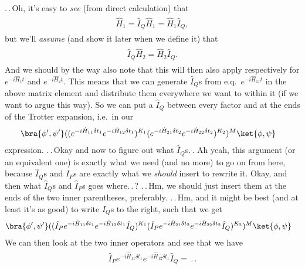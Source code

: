 \documentclass{report}
\begin{document}
.\,.\,Oh, it's easy to \emph{see} (from direct calculation) that 
\begin{align}
\begin{aligned}
	\hat H_1 = \hat I_Q \hat H_1 = \hat H_1 \hat I_Q,
\end{aligned}
\end{align}
but we'll \emph{assume} (and show it later when we define it) that
\begin{align}
\begin{aligned}
	\hat I_Q \hat H_2 = \hat H_2 \hat I_Q.
\end{aligned}
\end{align}
And we should by the way also note that this will then also apply respectively for $e^{-i  \hat H_1 t }$ and $e^{-i  \hat H_2 t }$. This means that we can generate $\hat I_Q$s from e.q.\ $e^{-i  \hat H_{11} t }$ in the above matrix element and distribute them everywhere we want to within it (if we want to argue this way). So we can put a $\hat I_Q$ between every factor and at the ends of the Trotter expansion, i.e.\ in our 
\begin{align}
\begin{aligned}
	\bra{\phi', \psi'} &(
		(e^{-i  \hat H_{11} \delta t_1 } e^{-i \hat H_{12} \delta t_1})^{K_1}
		(e^{-i  \hat H_{21} \delta t_2 } e^{-i \hat H_{22} \delta t_2})^{K_2}
	)^M
	\ket{\phi, \psi}
\end{aligned}
\end{align} 
expression. .\,.\,Okay and now to figure out what $\hat I_Q$s.\,. Ah yeah, this argument (or an equivalent one) is exactly what we need (and no more) to go on from here, because $\hat I_Q$s and $\hat I_P$s are exactly what we \emph{should} insert to rewrite it. Okay, and then what $\hat I_Q$s and $\hat I_P$s goes where.\,.\,? .\,.\,Hm, we should just insert them at the ends of the two inner parentheses, preferably. .\,.\,Hm, and it might be best (and at least it's as good) to write $\hat I_Q$s to the right, such that we get
\begin{align}
\begin{aligned}
	\bra{\phi', \psi'} &(
		(\hat I_P e^{-i  \hat H_{11} \delta t_1 } e^{-i \hat H_{12} \delta t_1} \hat I_Q)^{K_1}
		(\hat I_P e^{-i  \hat H_{21} \delta t_2 } e^{-i \hat H_{22} \delta t_2} \hat I_Q)^{K_2}
	)^M
	\ket{\phi, \psi}
\end{aligned}
\end{align} 
We can then look at the two inner operators and see that we have
\begin{align}
\begin{aligned}
	\hat I_P e^{-i  \hat H_{11} \delta t_1 } e^{-i \hat H_{12} \delta t_1} \hat I_Q
	= \,.\,.
\end{aligned}
\end{align} 
\end{document}
